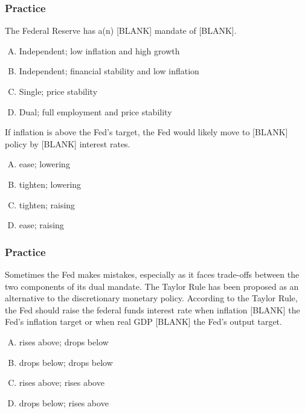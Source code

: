 \documentclass{beamer}
\begin{document}
\begin{practiceframe}
\frametitle{Practice}

    The Federal Reserve has a(n) [BLANK] mandate of [BLANK].
    \begin{enumerate}[A.]
        \item Independent; low inflation and high growth
        \item Independent; financial stability and low inflation
        \item Single; price stability
        \item Dual; full employment and price stability
    \end{enumerate}
    
    If inflation is above the Fed’s target, the Fed would likely move to [BLANK] policy by [BLANK] interest rates.
    \begin{enumerate}[A. ]
        \item ease; lowering
        \item tighten; lowering
        \item tighten; raising
        \item ease; raising
    \end{enumerate}

\end{practiceframe}

\begin{practiceframe}
\frametitle{Practice}

    Sometimes the Fed makes mistakes, especially as it faces trade-offs between the two components of its dual mandate.  The Taylor Rule has been proposed as an alternative to the discretionary monetary policy.  According to the Taylor Rule, the Fed should raise the federal funds interest rate when inflation [BLANK] the Fed's inflation target or when real GDP [BLANK] the Fed's output target.
    \begin{enumerate}[A. ]
        \item rises above; drops below
        \item drops below; drops below
        \item rises above; rises above
        \item drops below; rises above
    \end{enumerate}

\end{practiceframe}
\end{document}
